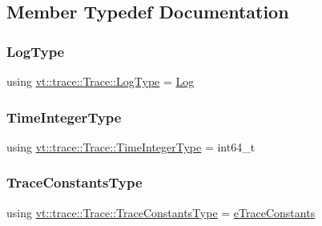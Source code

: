 \subsection{Member Typedef Documentation}
\mbox{\label{structvt_1_1trace_1_1_trace_a43306d96a91e49db081eaea016f1dd0a}} 
\subsubsection{\texorpdfstring{Log\+Type}{LogType}}
{\footnotesize\ttfamily using \hyperlink{structvt_1_1trace_1_1_trace_a43306d96a91e49db081eaea016f1dd0a}{vt\+::trace\+::\+Trace\+::\+Log\+Type} =  \hyperlink{structvt_1_1trace_1_1_log}{Log}}

\mbox{\label{structvt_1_1trace_1_1_trace_ab8db9218a8ab87f59773fcbf81433787}} 
\subsubsection{\texorpdfstring{Time\+Integer\+Type}{TimeIntegerType}}
{\footnotesize\ttfamily using \hyperlink{structvt_1_1trace_1_1_trace_ab8db9218a8ab87f59773fcbf81433787}{vt\+::trace\+::\+Trace\+::\+Time\+Integer\+Type} =  int64\+\_\+t}

\mbox{\label{structvt_1_1trace_1_1_trace_accb35b20499dfdd46e6c79daae9fc265}} 
\subsubsection{\texorpdfstring{Trace\+Constants\+Type}{TraceConstantsType}}
{\footnotesize\ttfamily using \hyperlink{namespacevt_1_1trace_acf454dfbd581b0ebae895f90b5927a1d}{vt\+::trace\+::\+Trace\+::\+Trace\+Constants\+Type} =  \hyperlink{namespacevt_1_1trace_acf454dfbd581b0ebae895f90b5927a1d}{e\+Trace\+Constants}}

